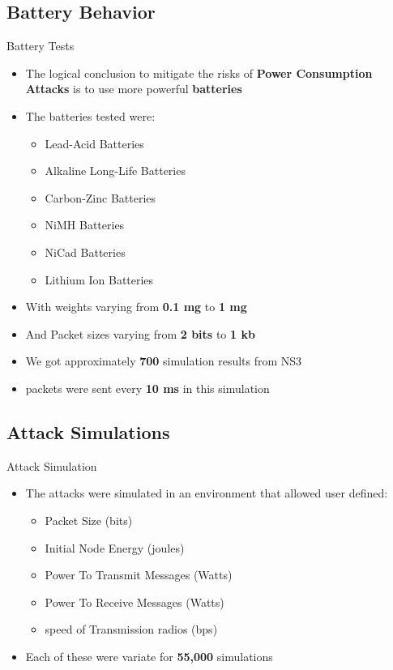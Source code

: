 \documentclass{beamer}
\begin{document}
\subsection{Battery Behavior}

\begin{frame}{Battery Tests}
\begin{itemize}
	\item The logical conclusion to mitigate the risks of \textbf{Power Consumption Attacks} is to use more powerful \textbf{batteries}
	\item The batteries tested were: 
	\begin{itemize}
	  \item Lead-Acid Batteries
	  \item Alkaline Long-Life Batteries
	  \item Carbon-Zinc Batteries
	  \item NiMH Batteries
	  \item NiCad Batteries
	  \item Lithium Ion Batteries
	\end{itemize}
	\item With weights varying from \textbf{0.1 mg} to \textbf{1 mg}
	\item And Packet sizes varying from \textbf{2 bits} to \textbf{1 kb}
	\item We got approximately \textbf{700} simulation results from NS3
	\item packets were sent every \textbf{10 ms} in this simulation
\end{itemize}
\end{frame}

\subsection{Attack Simulations}

\begin{frame}{Attack Simulation}
	\begin{itemize}
	\item The attacks were simulated in an environment that allowed user defined: 
	\begin{itemize}
		\item Packet Size (bits)
		\item Initial Node Energy (joules)
		\item Power To Transmit Messages (Watts)
		\item Power To Receive Messages (Watts)
		\item speed of Transmission radios (bps)
	\end{itemize}
	\item Each of these were variate for \textbf{55,000} simulations
	\end{itemize}
\end{frame}
\end{document}
